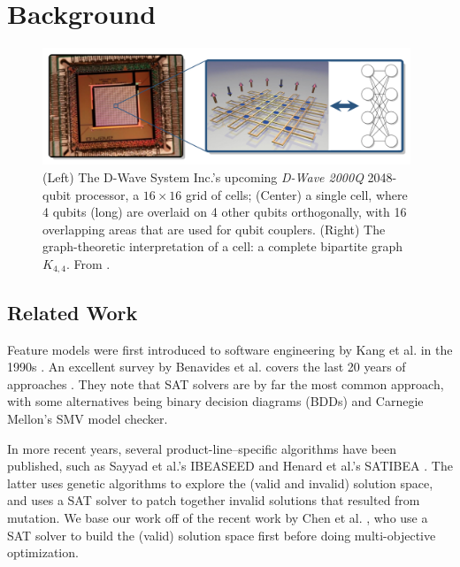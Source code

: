 \documentclass{sig-alternate-05-2015}
\begin{document}
\section{Background}

\begin{figure}[!h]
\centering
\includegraphics[width=0.98\textwidth]{images/hardware}
\caption{(Left) The D-Wave System Inc.'s upcoming \emph{D-Wave 2000Q} 2048-qubit processor, a $16 \times 16$ grid of cells; (Center) a single cell, where 4 qubits (long) are overlaid on 4 other qubits orthogonally, with 16 overlapping areas that are used for qubit couplers. (Right) The graph-theoretic interpretation of a cell: a complete bipartite graph $K_{4,4}$. From
\cite{goodrich2016graph}.}
\label{figure:hardware}
\end{figure}

\subsection{Related Work}
Feature models were first introduced to software engineering by Kang et al. in the 1990s \cite{kang1990feature}. An excellent survey by Benavides et al. covers the last 20 years of approaches \cite{benavides2010automated}. They note that SAT solvers are by far the most common approach, with some alternatives being binary decision diagrams (BDDs) and Carnegie Mellon's SMV model checker.

In more recent years, several product-line--specific algorithms have been published, such as Sayyad et al.'s IBEASEED \cite{sayyad2013scalable} and Henard et al.'s SATIBEA \cite{henard2015combining}. The latter uses genetic algorithms to explore the (valid and invalid) solution space, and uses a SAT solver to patch together invalid solutions that resulted from mutation. We base our work off of the recent work by Chen et al. \cite{chen2016sampling}, who use a SAT solver to build the (valid) solution space first before doing multi-objective optimization.
\end{document}
